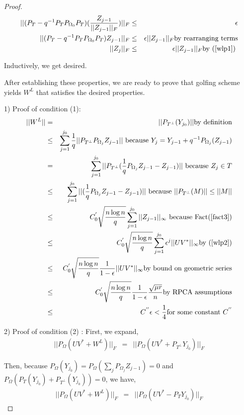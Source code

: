 \begin{proof}
\begin{eqnarray*}
||(P_{T}-q^{-1}P_{T}P_{\Omega_{0}}P_{T})(\frac{Z_{j-1}}{||Z_{j-1}||_{F}})||_{F} & \le & \epsilon\\
||(P_{T}-q^{-1}P_{T}P_{\Omega_{0}}P_{T})Z_{j-1}||_{F} & \le & \epsilon||Z_{j-1}||_{F} \text{by rearranging terms}\\
||Z_{j}||_{F} & \le & \epsilon||Z_{j-1}||_{F} \text{by (\ref{wlp1}) }
\end{eqnarray*}


Inductively, we get desired.

After establishing these properties, we are ready to prove that golfing scheme yields $W^{L}$ that satisfies the desired properties.

1) Proof of condition (1):
\begin{eqnarray*}
||W^{L}|| & = & ||P_{T^{\bot}}(Y_{j_{0}})|| \text{by definition}\\
 & \le & \sum_{j=1}^{j_{0}}\frac{1}{q}||P_{T^{\bot}}P_{\Omega_{j}}Z_{j-1}||\text{ because }Y_{j}=Y_{j-1}+q^{-1}P_{\Omega_{j}}(Z_{j-1})\\
 & = & \sum_{j=1}^{j_{0}}||P_{T^{\bot}}(\frac{1}{q}P_{\Omega_{j}}Z_{j-1}-Z_{j-1})||\text{ because }Z_{j}\in T\\
 & \le & \sum_{j=1}^{j_{0}}||(\frac{1}{q}P_{\Omega_{j}}Z_{j-1}-Z_{j-1})||\text{ because }||P_{T^{\bot}}(M)||\le||M||\\
 & \le & C_{0}^{'}\sqrt{\frac{n\log n}{q}}\sum_{j=1}^{j_{0}}||Z_{j-1}||_{\infty}\text{ because Fact(\ref{fact3})}\\
 & \le & C_{0}^{'}\sqrt{\frac{n\log n}{q}}\sum_{j=1}^{j_{0}}\epsilon^{j}||UV^{*}||_{\infty} \text{by (\ref{wlp2})}\\
 & \le & C_{0}^{'}\sqrt{\frac{n\log n}{q}}\frac{1}{1-\epsilon}||UV^{*}||_{\infty} \text{by bound on geometric series}\\
 & \le & C_{0}^{'}\sqrt{\frac{n\log n}{q}}\frac{1}{1-\epsilon}\frac{\sqrt{\mu r}}{n}\text{by RPCA assumptions}\\
 & \le & C^{''}\epsilon<\frac{1}{4}\text{for some constant }C^{''}
\end{eqnarray*}


2) Proof of condition (2) : First, we expand,
\begin{eqnarray*}
||P_{\Omega}(UV^{*}+W^{L})||_{F} & = & ||P_{\Omega}(UV^{*}+P_{T^{\bot}}Y_{j_{0}})||_{F}
\end{eqnarray*}

Then, because $P_{\Omega}(Y_{j_{0}})=P_{\Omega}(\sum_{j}P_{\Omega_{j}}Z_{j-1})=0$ and $P_{\Omega}(P_{T}(Y_{j_{0}})+P_{T^{\bot}}(Y_{j_{0}}))=0$, we have,
\begin{eqnarray*}
||P_{\Omega}(UV^{*}+W^{L})||_{F} & = & ||P_{\Omega}(UV^{*}-P_{T}Y_{j_{0}})||_{F}
\end{eqnarray*}



\end{proof}

